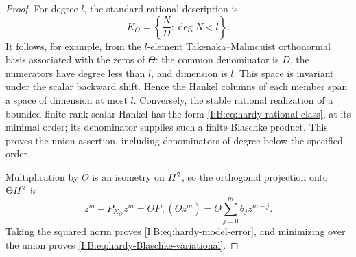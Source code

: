 \begin{proof}
For degree $l$, the standard rational description is
\[
 K_\Theta=\left\{\frac{N}{D}:\deg N<l\right\}.
\]
It follows, for example, from the $l$-element Takenaka--Malmquist orthonormal
basis associated with the zeros of $\Theta$: the common denominator is $D$,
the numerators have degree less than $l$, and dimension is $l$.  This
space is invariant under the scalar backward shift.  Hence the Hankel
columns of each member span a space of dimension at most $l$.  Conversely,
the stable rational realization of a bounded finite-rank scalar Hankel
has the form \eqref{I:B:eq:hardy-rational-class}, at its minimal order; its
denominator supplies such a finite Blaschke product.  This proves the union
assertion, including denominators of degree below the specified order.

Multiplication by $\Theta$ is an isometry on $H^2$, so the orthogonal
projection onto $\Theta H^2$ is
\[
 z^m-P_{K_\Theta}z^m
 =\Theta P_+(\overline\Theta z^m)
 =\Theta\sum_{j=0}^m\overline{\theta_j}z^{m-j}.
\]
Taking the squared norm proves \eqref{I:B:eq:hardy-model-error}, and minimizing
over the union proves \eqref{I:B:eq:hardy-Blaschke-variational}.
\end{proof}
